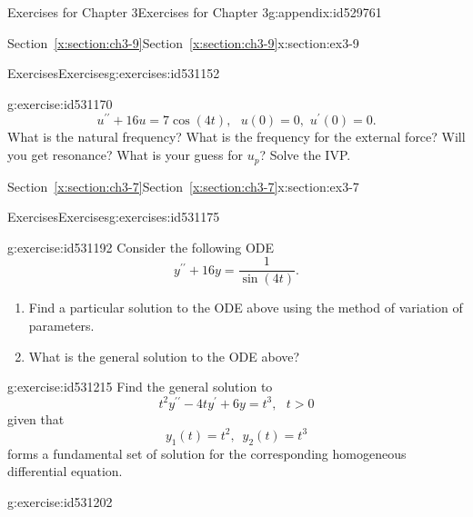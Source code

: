 \documentclass[oneside,10pt,]{book}
\newcommand{\xreffont}{\relax}
\numberwithin{equation}{section}
\numberwithin{equation}{section}
\begin{document}
\begin{appendixptx}{Exercises for Chapter 3}{}{Exercises for Chapter 3}{}{}{g:appendix:id529761}
\begin{sectionptx}{Section~{\xreffont\ref*{x:section:ch3-9}}}{}{Section~{\xreffont\ref*{x:section:ch3-9}}}{}{}{x:section:ex3-9}
\begin{exercises-subsection-numberless}{Exercises}{}{Exercises}{}{}{g:exercises:id531152}
\begin{divisionexercise}{4}{}{}{g:exercise:id531170}
\begin{equation*}
u^{\prime\prime}+16u=7\cos\left(4t\right),\,\,\,\,u(0)=0,\,\,u^{\prime}(0)=0.
\end{equation*}
What is the natural frequency? What is the frequency for the external force? Will you get resonance? What is your guess for \(u_{p}\)? Solve the IVP.%
\end{divisionexercise}%
\end{exercises-subsection-numberless}
\end{sectionptx}
%
%
\typeout{************************************************}
\typeout{Section D.8 Section~{\xreffont\ref*{x:section:ch3-7}}}
\typeout{************************************************}
%
\begin{sectionptx}{Section~{\xreffont\ref*{x:section:ch3-7}}}{}{Section~{\xreffont\ref*{x:section:ch3-7}}}{}{}{x:section:ex3-7}
%
%
\typeout{************************************************}
\typeout{************************************************}
%
\begin{exercises-subsection-numberless}{Exercises}{}{Exercises}{}{}{g:exercises:id531175}
\begin{divisionexercise}{1}{}{}{g:exercise:id531192}%
Consider the following ODE%
\begin{equation*}
y^{\prime\prime}+16y=\frac{1}{\sin\left(4t\right)}.
\end{equation*}
%
\begin{enumerate}[label=(\alph*)]
\item{}Find a particular solution to the ODE above using the method of variation of parameters.%
\item{}What is the general solution to the ODE above?%
\end{enumerate}
%
\end{divisionexercise}%
\begin{divisionexercise}{2}{}{}{g:exercise:id531215}%
Find the general solution to%
\begin{equation*}
t^{2}y^{\prime\prime}-4ty^{\prime}+6y=t^{3},\,\,\,\,t>0
\end{equation*}
given that%
\begin{equation*}
y_{1}(t)=t^{2},\,\,\,y_{2}(t)=t^{3}
\end{equation*}
forms a fundamental set of solution for the corresponding homogeneous differential equation.%
\end{divisionexercise}%
\begin{divisionexercise}{3}{}{}{g:exercise:id531202}%

\end{divisionexercise}
\end{exercises-subsection-numberless}
\end{sectionptx}
\end{appendixptx}
\end{document}
